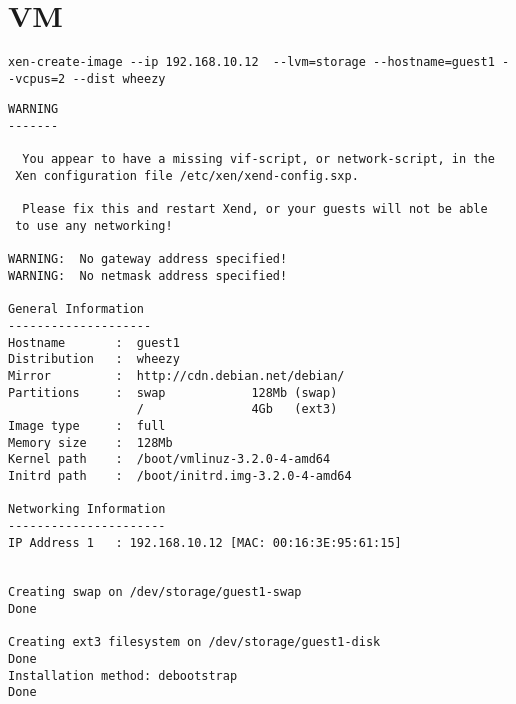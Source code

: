 \chapter{VM}
\begin{verbatim}
xen-create-image --ip 192.168.10.12  --lvm=storage --hostname=guest1 --vcpus=2 --dist wheezy
\end{verbatim}
\setupVerbatimOut
\begin{verbatim}                                                  
WARNING                                           
-------                                           
                                                  
  You appear to have a missing vif-script, or network-script, in the
 Xen configuration file /etc/xen/xend-config.sxp. 
                                                  
  Please fix this and restart Xend, or your guests will not be able
 to use any networking!                           
                                                  
WARNING:  No gateway address specified!           
WARNING:  No netmask address specified!           
                                                  
General Information                               
--------------------                              
Hostname       :  guest1                          
Distribution   :  wheezy                          
Mirror         :  http://cdn.debian.net/debian/   
Partitions     :  swap            128Mb (swap)    
                  /               4Gb   (ext3)    
Image type     :  full                            
Memory size    :  128Mb                           
Kernel path    :  /boot/vmlinuz-3.2.0-4-amd64     
Initrd path    :  /boot/initrd.img-3.2.0-4-amd64  
                                                  
Networking Information                            
----------------------                            
IP Address 1   : 192.168.10.12 [MAC: 00:16:3E:95:61:15]
                                                  
                                                  
Creating swap on /dev/storage/guest1-swap         
Done                                              
                                                  
Creating ext3 filesystem on /dev/storage/guest1-disk
Done                                              
Installation method: debootstrap
Done


\end{verbatim}
